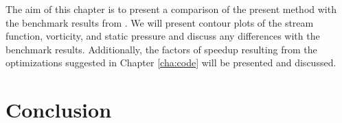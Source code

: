 \documentclass[a4paper, 11pt, toc=bibliography, parskip=half]{scrreprt}
\begin{document}
The aim of this chapter is to present a comparison of the present method with the benchmark results from \parencite{botella1998benchmark}. We will present contour plots of the stream function, vorticity, and static pressure and discuss any differences with the benchmark results. Additionally, the factors of speedup resulting from the optimizations suggested in Chapter \ref{cha:code} will be presented and discussed.



\chapter{Conclusion}
\label{cha:conclusion}



\printbibliography[heading=bibintoc, title={References}]
\end{document}
